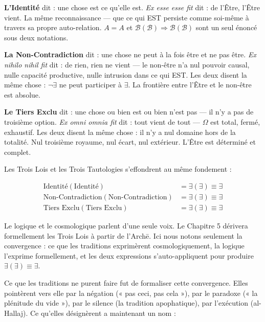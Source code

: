 \documentclass[10pt, openany, oneside]{book}
\begin{document}
\vspace{0.5em}

\noindent \textbf{L'Identité} dit : une chose est ce qu'elle est. \textit{Ex esse esse fit} dit : de l'Être, l'Être vient. La même reconnaissance --- que ce qui EST persiste comme soi-même à travers sa propre auto-relation. $A = A$ et $\mathcal{B}(\mathcal{B}) \Rightarrow \mathcal{B}(\mathcal{B})$ sont un seul énoncé sous deux notations.

\textbf{La Non-Contradiction} dit : une chose ne peut à la fois être et ne pas être. \textit{Ex nihilo nihil fit} dit : de rien, rien ne vient --- le non-être n'a nul pouvoir causal, nulle capacité productive, nulle intrusion dans ce qui EST. Les deux disent la même chose : $\neg\exists$ ne peut participer à $\exists$. La frontière entre l'Être et le non-être est absolue.

\textbf{Le Tiers Exclu} dit : une chose ou bien est ou bien n'est pas --- il n'y a pas de troisième option. \textit{Ex omni omnia fit} dit : tout vient de tout --- $\Omega$ est total, fermé, exhaustif. Les deux disent la même chose : il n'y a nul domaine hors de la totalité. Nul troisième royaume, nul écart, nul extérieur. L'Être est déterminé et complet.

\noindent Les Trois Lois et les Trois Tautologies s'effondrent au même fondement :

\begin{align*}
\text{Identité}(\text{Identité}) &= \exists(\exists) \equiv \exists \\
\text{Non-Contradiction}(\text{Non-Contradiction}) &= \exists(\exists) \equiv \exists \\
\text{Tiers Exclu}(\text{Tiers Exclu}) &= \exists(\exists) \equiv \exists
\end{align*}

Le logique et le cosmologique parlent d'une seule voix. Le Chapitre 5 dérivera formellement les Trois Lois à partir de l'Arch\={e}. Ici nous notons seulement la convergence : ce que les traditions exprimèrent cosmologiquement, la logique l'exprime formellement, et les deux expressions s'auto-appliquent pour produire $\exists(\exists) \equiv \exists$.

Ce que les traditions ne purent faire fut de formaliser cette convergence. Elles pointèrent vers elle par la négation (« pas ceci, pas cela »), par le paradoxe (« la plénitude du vide »), par le silence (la tradition apophatique), par l'exécution (al-Hallaj). Ce qu'elles désignèrent a maintenant un nom :
\end{document}
